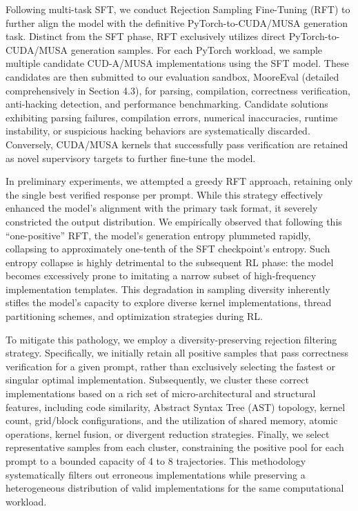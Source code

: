 \documentclass[
  10
]{article}
\begin{document}
Following multi-task SFT, we conduct Rejection Sampling Fine-Tuning
(RFT) to further align the model with the definitive
PyTorch-to-CUDA/MUSA generation task. Distinct from the SFT phase, RFT
exclusively utilizes direct PyTorch-to-CUDA/MUSA generation samples. For
each PyTorch workload, we sample multiple candidate CUD-A/MUSA
implementations using the SFT model. These candidates are then submitted
to our evaluation sandbox, MooreEval (detailed comprehensively in
Section 4.3), for parsing, compilation, correctness verification,
anti-hacking detection, and performance benchmarking. Candidate
solutions exhibiting parsing failures, compilation errors, numerical
inaccuracies, runtime instability, or suspicious hacking behaviors are
systematically discarded. Conversely, CUDA/MUSA kernels that
successfully pass verification are retained as novel supervisory targets
to further fine-tune the model.

In preliminary experiments, we attempted a greedy RFT approach,
retaining only the single best verified response per prompt. While this
strategy effectively enhanced the model's alignment with the primary
task format, it severely constricted the output distribution. We
empirically observed that following this ``one-positive'' RFT, the
model's generation entropy plummeted rapidly, collapsing to
approximately one-tenth of the SFT checkpoint's entropy. Such entropy
collapse is highly detrimental to the subsequent RL phase: the model
becomes excessively prone to imitating a narrow subset of high-frequency
implementation templates. This degradation in sampling diversity
inherently stifles the model's capacity to explore diverse kernel
implementations, thread partitioning schemes, and optimization
strategies during RL.

To mitigate this pathology, we employ a diversity-preserving rejection
filtering strategy. Specifically, we initially retain all positive
samples that pass correctness verification for a given prompt, rather
than exclusively selecting the fastest or singular optimal
implementation. Subsequently, we cluster these correct implementations
based on a rich set of micro-architectural and structural features,
including code similarity, Abstract Syntax Tree (AST) topology, kernel
count, grid/block configurations, and the utilization of shared memory,
atomic operations, kernel fusion, or divergent reduction strategies.
Finally, we select representative samples from each cluster,
constraining the positive pool for each prompt to a bounded capacity of
4 to 8 trajectories. This methodology systematically filters out
erroneous implementations while preserving a heterogeneous distribution
of valid implementations for the same computational workload.
\end{document}
